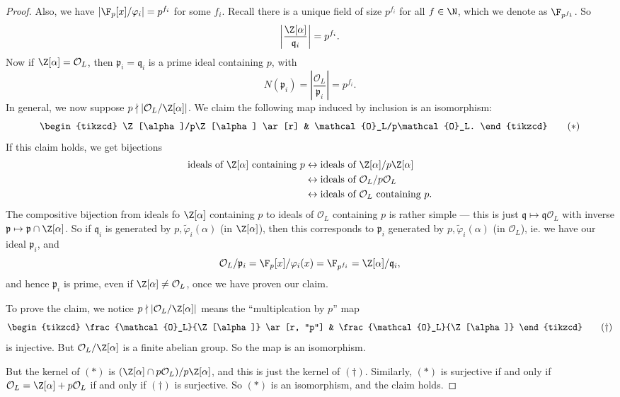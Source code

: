 \documentclass[a4paper]{article}
\begin{document}
\begin{proof}
  Also, we have $|\F_p[x]/\varphi_i| = p^{f_i}$ for some $f_i$. Recall there is a unique field of size $p^{f_i}$ for all $f \in \N$, which we denote as $\F_{p^{f_1}}$. So
  \[
    \left|\frac{\Z[\alpha]}{\mathfrak{q}_i}\right| = p^{f_i}.
  \]
  Now if $\Z[\alpha] = \mathcal{O}_L$, then $\mathfrak{p}_i = \mathfrak{q}_i$ is a prime ideal containing $p$, with
  \[
    N(\mathfrak{p}_i) = \left|\frac{\mathcal{O}_L}{\mathfrak{p}_i}\right| = p^{f_i}.
  \]
  In general, we now suppose $p \nmid |\mathcal{O}_L/\Z[\alpha]|$. We claim the following map induced by inclusion is an isomorphism:
  \[
    \begin{tikzcd}
      \Z[\alpha]/p\Z[\alpha] \ar[r] & \mathcal{O}_L/p\mathcal{O}_L.
    \end{tikzcd}\tag{$*$}
  \]
  If this claim holds, we get bijections
  \begin{align*}
    \text{ideals of }\Z[\alpha]\text{ containing }p &\leftrightarrow \text{ideals of }\Z[\alpha]/ p\Z[\alpha]\\
    &\leftrightarrow \text{ideals of }\mathcal{O}_L/ p\mathcal{O}_L\\
    &\leftrightarrow \text{ideals of }\mathcal{O}_L\text{ containing }p.
  \end{align*}
  The compositive bijection from ideals fo $\Z[\alpha]$ containing $p$ to ideals of $\mathcal{O}_L$ containing $p$ is rather simple --- this is just $\mathfrak{q} \mapsto \mathfrak{q}\mathcal{O}_L$ with inverse $\mathfrak{p} \mapsto \mathfrak{p}\cap \Z[\alpha]$. So if $\mathfrak{q}_i$ is generated by $p, \tilde{\varphi}_i(\alpha)$ (in $\Z[\alpha]$), then this corresponds to $\mathfrak{p}_i$ generated by $p, \tilde{\varphi}_i(\alpha)$ (in $\mathcal{O}_L$), ie. we have our ideal $\mathfrak{p}_i$, and
  \[
    \mathcal{O}_L/\mathfrak{p}_i = \F_p[x]/\varphi_i(x) = \F_{p^{f_i}} = \Z[\alpha]/\mathfrak{q}_i,
  \]
  and hence $\mathfrak{p}_i$ is prime, even if $\Z[\alpha] \not= \mathcal{O}_L$, once we have proven our claim.

  To prove the claim, we notice $p \nmid |\mathcal{O}_L/\Z[\alpha]|$ means the ``multiplcation by $p$'' map
  \[
    \begin{tikzcd}
      \frac{\mathcal{O}_L}{\Z[\alpha]} \ar[r, "p"] & \frac{\mathcal{O}_L}{\Z[\alpha]}
    \end{tikzcd}\tag{$\dagger$}
  \]
  is injective. But $\mathcal{O}_L/\Z[\alpha]$ is a finite abelian group. So the map is an isomorphism.

  But the kernel of $(*)$ is $(\Z[\alpha] \cap p\mathcal{O}_L)/p\Z[\alpha]$, and this is just the kernel of $(\dagger)$. Similarly, $(*)$ is surjective if and only if $\mathcal{O}_L = \Z[\alpha] + p\mathcal{O}_L$ if and only if $(\dagger)$ is surjective. So $(*)$ is an isomorphism, and the claim holds.


\end{proof}
\end{document}
